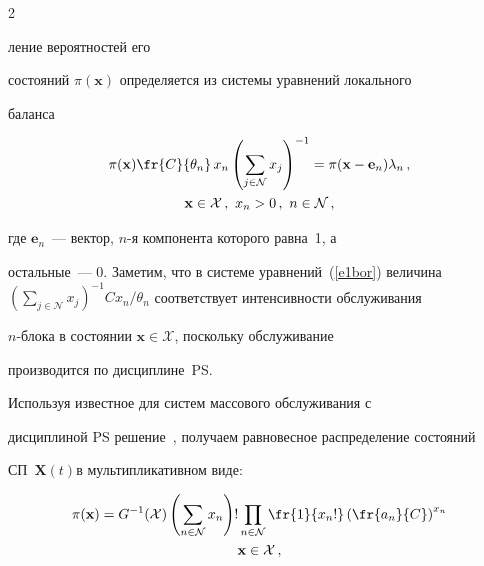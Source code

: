   


\begin{multicols}{2}





\noindent


ление вероятностей его 


состояний $\pi (\mathbf{x})$ определяется из системы уравнений локального 


баланса


\begin{multline}


\pi (\mathbf{x} ) \fr{C}{\theta_n}\, x_n \left ( \sum\limits_{j\in {\mathcal N}}x_j\right )^{-1} 


=\pi (\mathbf{x} -\mathbf{e}_n)\lambda_n\,,\\


\mathbf{x}\in {\mathcal X}\,,\ x_n >0\,, \  n\in {\mathcal N}\,,


\label{e1bor}


\end{multline}


    где $\mathbf{e}_n$~--- вектор, $n$-я компонента которого равна~1, а 


остальные~--- 0. Заметим, что в сис\-те\-ме урав\-не\-ний~(\ref{e1bor}) величина $(\sum\limits_{j\in {\mathcal 


N}} x_j)^{-1} Cx_n/\theta_n$ соответствует интенсивности обслуживания 


  $n$-блока в состоянии $\mathbf{x}\in {\mathcal X}$, поскольку обслуживание 


производится по дисциплине~PS.








  Используя известное для систем массового обслуживания с 


дисциплиной PS решение~\cite{8bor}, получаем равновесное распределение состояний 


СП~$\mathbf{X}(t)$в мультипликативном виде:


  \begin{multline*}


  \pi (\mathbf{x} ) = G^{-1} ({\mathcal X}) \left ( \sum\limits_{n\in {\mathcal N}} x_n\right ) !


  \prod_{n\in {\mathcal N}} \fr{1}{x_n!} \left ( \fr{a_n}{C}\right )^{x_n}\\ %


\mathbf{x}\in {\mathcal X}\,,



\end{multline*}
\end{multicols}

